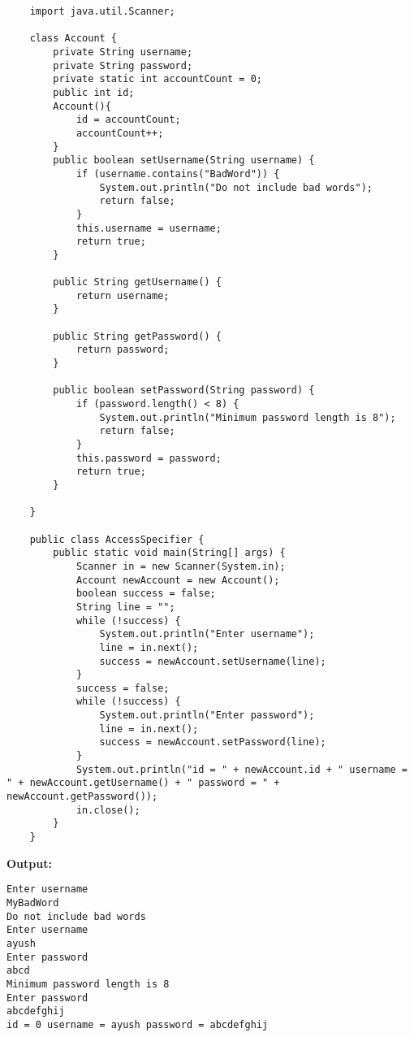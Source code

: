 \documentclass{book}
\begin{document}
\begin{verbatim}
    import java.util.Scanner;

    class Account {
        private String username;
        private String password;
        private static int accountCount = 0;
        public int id;
        Account(){
            id = accountCount;
            accountCount++;
        }
        public boolean setUsername(String username) {
            if (username.contains("BadWord")) {
                System.out.println("Do not include bad words");
                return false;
            }
            this.username = username;
            return true;
        }

        public String getUsername() {
            return username;
        }

        public String getPassword() {
            return password;
        }

        public boolean setPassword(String password) {
            if (password.length() < 8) {
                System.out.println("Minimum password length is 8");
                return false;
            }
            this.password = password;
            return true;
        }

    }

    public class AccessSpecifier {
        public static void main(String[] args) {
            Scanner in = new Scanner(System.in);
            Account newAccount = new Account();
            boolean success = false;
            String line = "";
            while (!success) {
                System.out.println("Enter username");
                line = in.next();
                success = newAccount.setUsername(line);
            }
            success = false;
            while (!success) {
                System.out.println("Enter password");
                line = in.next();
                success = newAccount.setPassword(line);
            }
            System.out.println("id = " + newAccount.id + " username = " + newAccount.getUsername() + " password = " + newAccount.getPassword());
            in.close();
        }
    }

\end{verbatim}
\par
\textbf{Output:}
\begin{verbatim}
Enter username
MyBadWord
Do not include bad words
Enter username
ayush
Enter password
abcd
Minimum password length is 8
Enter password
abcdefghij
id = 0 username = ayush password = abcdefghij
\end{verbatim}
\end{document}
